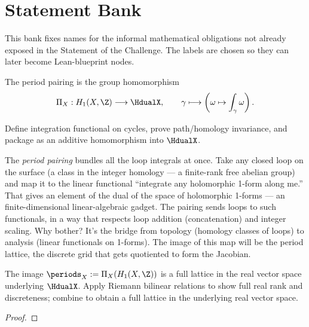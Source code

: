 %

\section{Statement Bank}
\label{sec:statement-bank}

This bank fixes names for the informal mathematical obligations not
already exposed in the Statement of the Challenge. The labels are chosen
so they can later become Lean-blueprint nodes.

\begin{definition}
\label{def:period-pairing}
The period pairing is the group homomorphism
\[
  \Pi_X : H_{1}(X,\Z) \longrightarrow \HdualX,\qquad
  \gamma \longmapsto \left(\omega \mapsto \int_{\gamma}\omega\right).
\]
\leanok

\proofplan
\leanok
Define integration functional on cycles, prove path/homology invariance, and
package as an additive homomorphism into \(\HdualX\).
\end{definition}

\begin{layman}
The \emph{period pairing} bundles all the loop integrals at once. Take
any closed loop on the surface (a class in the integer homology --- a
finite-rank free abelian group) and map it to the linear functional
``integrate any holomorphic 1-form along me.'' That gives an element
of the dual of the space of holomorphic 1-forms --- an finite-dimensional linear-algebraic gadget. The pairing sends loops to
such functionals, in a way that respects loop addition (concatenation)
and integer scaling. Why bother? It's the bridge from topology
(homology classes of loops) to analysis (linear functionals on
1-forms). The image of this map will be the period lattice, the
discrete grid that gets quotiented to form the Jacobian.
\end{layman}

\begin{theorem}
\label{thm:period-lattice}
The image \(\periods_X := \Pi_X(H_1(X,\Z))\) is a full lattice in the
real vector space underlying \(\HdualX\).
\leanok
\proofplan
Apply Riemann bilinear relations to show full real rank and discreteness; combine
to obtain a full lattice in the underlying real vector space.
\end{theorem}
\begin{proof}
\leanok
\end{proof}

